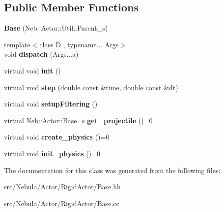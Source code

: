 \subsection*{\-Public \-Member \-Functions}
\begin{DoxyCompactItemize}
\item 
\hypertarget{classNeb_1_1Actor_1_1RigidActor_1_1Base_aa0ba49934f963f62868f795bf30d0094}{{\bfseries \-Base} (\-Neb\-::\-Actor\-::\-Util\-::\-Parent\-\_\-s)}\label{classNeb_1_1Actor_1_1RigidActor_1_1Base_aa0ba49934f963f62868f795bf30d0094}

\item 
\hypertarget{classNeb_1_1Actor_1_1RigidActor_1_1Base_adf9c1fc31512c3b3748342ac9f0ae647}{{\footnotesize template$<$class D , typename... \-Args$>$ }\\void {\bfseries dispatch} (\-Args...\-a)}\label{classNeb_1_1Actor_1_1RigidActor_1_1Base_adf9c1fc31512c3b3748342ac9f0ae647}

\item 
\hypertarget{classNeb_1_1Actor_1_1RigidActor_1_1Base_a766bc8b5e81030cad05207e9ed76ba94}{virtual void {\bfseries init} ()}\label{classNeb_1_1Actor_1_1RigidActor_1_1Base_a766bc8b5e81030cad05207e9ed76ba94}

\item 
\hypertarget{classNeb_1_1Actor_1_1RigidActor_1_1Base_a33114287de0d373ceca81a52c41745ad}{virtual void {\bfseries step} (double const \&time, double const \&dt)}\label{classNeb_1_1Actor_1_1RigidActor_1_1Base_a33114287de0d373ceca81a52c41745ad}

\item 
\hypertarget{classNeb_1_1Actor_1_1RigidActor_1_1Base_accf86e508f0ab034bd212b1264644a4c}{virtual void {\bfseries setup\-Filtering} ()}\label{classNeb_1_1Actor_1_1RigidActor_1_1Base_accf86e508f0ab034bd212b1264644a4c}

\item 
\hypertarget{classNeb_1_1Actor_1_1RigidActor_1_1Base_a7fe627181ce217ec0dfd5eb23b410c49}{virtual \-Neb\-::\-Actor\-::\-Base\-\_\-s {\bfseries get\-\_\-projectile} ()=0}\label{classNeb_1_1Actor_1_1RigidActor_1_1Base_a7fe627181ce217ec0dfd5eb23b410c49}

\item 
\hypertarget{classNeb_1_1Actor_1_1RigidActor_1_1Base_ac7662178d8468d3d80fe1074f3e03277}{virtual void {\bfseries create\-\_\-physics} ()=0}\label{classNeb_1_1Actor_1_1RigidActor_1_1Base_ac7662178d8468d3d80fe1074f3e03277}

\item 
\hypertarget{classNeb_1_1Actor_1_1RigidActor_1_1Base_aff211aa28ad50ac3f141bfbde642d738}{virtual void {\bfseries init\-\_\-physics} ()=0}\label{classNeb_1_1Actor_1_1RigidActor_1_1Base_aff211aa28ad50ac3f141bfbde642d738}

\end{DoxyCompactItemize}


\-The documentation for this class was generated from the following files\-:\begin{DoxyCompactItemize}
\item 
src/\-Nebula/\-Actor/\-Rigid\-Actor/\-Base.\-hh\item 
src/\-Nebula/\-Actor/\-Rigid\-Actor/\-Base.\-cc\end{DoxyCompactItemize}
